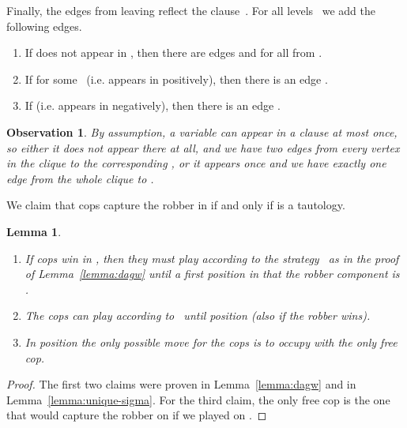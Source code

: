 \documentclass[authoryear]{article}
\makeatletter
\newtheorem{lemma}[theorem]{Lemma}
\newtheorem{observation}[theorem]{Observation}
\theoremstyle{definition}
\newcommand{\0}{\emptyset}
\newcommand{\ie}{i.e.\@\xspace}
\makeatother
\begin{document}
Finally, the edges from  leaving  reflect the
clause~. For all levels~ we add the following edges.
\begin{enumerate}
\item If  does not appear in , then there are edges
   and  for all  from . 
\item If  for some~ (\ie  appears in 
  positively), then there is an edge .
\item If  (\ie  appears in  negatively), then there is
  an edge .
\end{enumerate}
\begin{observation}\label{obs:two-or-one}
By assumption, a variable can appear in a clause at most
once, so either it does not appear there at all, and we have two edges
from every vertex in the clique to the corresponding , or it appears once
and we have exactly one edge from the whole clique to .
\end{observation}

We claim that  cops capture the robber in  if and only if
 is a tautology. 
\begin{lemma}\label{lemma:in-F-phi}
  \begin{enumerate}
  \item If  cops win in , then they must play according
    to the strategy~ as in the proof of Lemma~\ref{lemma:dagw} until
    a first position  in that the robber component is .
  \item The cops can play according to~ until position 
    (also if the robber wins).
  \item In position  the only possible move for the cops is to occupy 
with the only free cop.
  \end{enumerate}
\end{lemma}
\begin{proof}
  The first two claims were proven in Lemma~\ref{lemma:dagw} and in
  Lemma~\ref{lemma:unique-sigma}. For the third claim, the only free
  cop is the one that would capture the robber on
 if we played on .
\end{proof}
\end{document}
